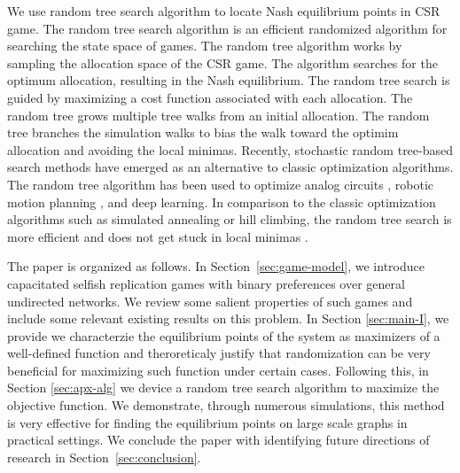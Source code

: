 We use random tree search algorithm to locate Nash equilibrium points in CSR game. The random tree search algorithm is an efficient randomized algorithm for searching the state space of games. The random tree algorithm works by sampling the allocation space of the CSR game. The algorithm searches for the optimum allocation, resulting in the Nash equilibrium.
The random tree search is guided by maximizing a cost function associated with each allocation. The random tree grows multiple tree walks from an initial allocation. The random tree branches the simulation walks to bias the walk toward the optimim allocation and avoiding the local minimas.
Recently, stochastic random tree-based search methods have emerged as an alternative to classic optimization algorithms.  The random tree algorithm has been used to optimize analog circuits \cite{adel2015}, robotic motion planning \cite{Lavalle2006}, and deep learning\cite{silver2016}. In comparison to the classic optimization algorithms such as simulated annealing or hill climbing, the random tree search is more efficient and does not get stuck in local minimas \cite{adel15, Lavalle2006}. 


The paper is organized as follows. In Section~\ref{sec:game-model}, we introduce capacitated selfish replication games with binary preferences over general undirected networks. We review some salient properties of such games and include some relevant existing results on this problem. In Section \ref{sec:main-I}, we provide we characterzie the equilibrium points of the system as maximizers of a well-defined function and theroreticaly justify that randomization can be very beneficial for maximizing such function under certain cases. Following this, in Section \ref{sec:apx-alg} we device a random tree search algorithm to maximize the objective function. We demonstrate, through numerous simulations, this method is very effective for finding the equilibrium points on large scale graphs in practical settings. We conclude the paper with identifying future directions of research in Section~\ref{sec:conclusion}.

